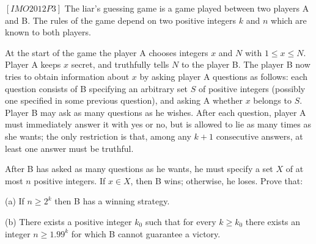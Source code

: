 \begin{problem}
$[IMO2012P3]$
The liar’s guessing game is a game played between two players A and B. The rules of the game depend on two positive integers $k$ and $n$ which are known to both players.

At the start of the game the player A chooses integers $x$ and $N$ with $1 \le x \le N$. Player A keeps $x$ secret, and truthfully tells $N$ to the player B. The player B now tries to obtain information about $x$ by asking player A questions as follows: each question consists of B specifying an arbitrary set $S$ of positive integers (possibly one specified in some previous question), and asking A whether $x$ belongs to $S$. Player B may ask as many questions as he wishes. After each question, player A must immediately answer it with yes or no, but is allowed to lie as many times as she wants; the only restriction is that, among any $k+1$ consecutive answers, at least one answer must be truthful.

After B has asked as many questions as he wants, he must specify a set $X$ of at most $n$ positive integers. If $x \in X$, then B wins; otherwise, he loses. Prove that:

(a) If $n \ge 2^k$ then B has a winning strategy.

(b) There exists a positive integer $k_0$ such that for every $k \ge k_0$ there exists an integer $n \ge 1.99^k$ for which B cannot guarantee a victory.

\end{problem}

